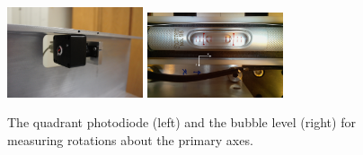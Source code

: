     \begin{figure}[]
        \includegraphics[width=4cm]{plots/qpd.jpg}
        \includegraphics[width=4cm]{plots/whitetray.jpg}
      \caption{The quadrant photodiode (left) and the bubble level
                (right) for measuring rotations about the primary
                axes.}
      \label{fig:bubblelevel}
    \end{figure}  







